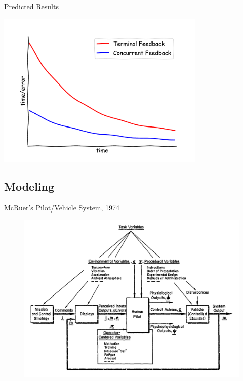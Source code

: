 \documentclass[10pt]{beamer}
\begin{document}
\begin{frame}[fragile]{Predicted Results}
  \begin{center}
    \includegraphics[width=0.75\textwidth]{../img/robot_estimate.pdf}
  \end{center}
\end{frame}

\subsection{Modeling}

\begin{frame}[fragile]{McRuer's Pilot/Vehicle System, 1974~\cite{McRuer1974}}
  \begin{figure}[h!]
    \begin{center}
      \includegraphics[width=\linewidth]{../img/Screen_Shot_2018-07-25_at_10.37.08_AM.png}
    \end{center}
  \end{figure}
\end{frame}
\end{document}
